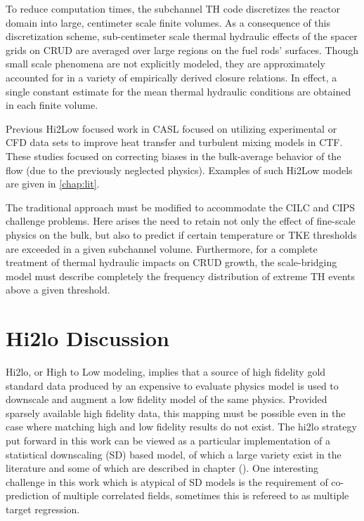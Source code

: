 To reduce computation times, the subchannel TH code discretizes the reactor
domain into large, centimeter scale finite volumes. As a consequence of this
discretization scheme, sub-centimeter scale thermal hydraulic effects of the
spacer grids on CRUD are averaged over large regions on the fuel rods'
surfaces.  Though small scale phenomena are not explicitly modeled, they are
approximately accounted for in a variety of empirically derived closure
relations.  In effect, a single constant estimate for the mean thermal
hydraulic conditions are obtained in each finite volume.

Previous Hi2Low focused work in CASL focused on utilizing experimental or CFD
data sets to improve heat transfer and turbulent mixing models in CTF.  These studies focused on
correcting biases in the bulk-average behavior of the flow (due to the
previously neglected physics).  Examples of such Hi2Low models are given in
\autoref{chap:lit}.

The traditional approach must be modified to accommodate the CILC and CIPS
challenge problems.  Here arises the need to retain not only the effect of
fine-scale physics on the bulk, but also to predict if certain temperature or
TKE thresholds are exceeded in a given subchannel volume.  Furthermore, for a
complete treatment of thermal hydraulic impacts on CRUD growth, the
scale-bridging model must describe completely the frequency distribution of
extreme TH events above a given threshold.


\section{Hi2lo Discussion}

Hi2lo, or High to Low modeling, implies that a source of high fidelity gold standard data produced by an expensive to evaluate physics model is used to downscale and augment a low fidelity model of the same physics.
Provided sparsely available high fidelity data, this mapping must be possible even in the case where matching high and low fidelity results do not exist.  The hi2lo strategy put forward in this work can be viewed as a particular implementation of a statistical downscaling (SD) based model, of which a large variety exist in the literature and some of which are described in chapter ().  One interesting challenge in this work which is atypical of SD models is the requirement of co-prediction of multiple correlated fields, sometimes this is refereed to as multiple target regression.


